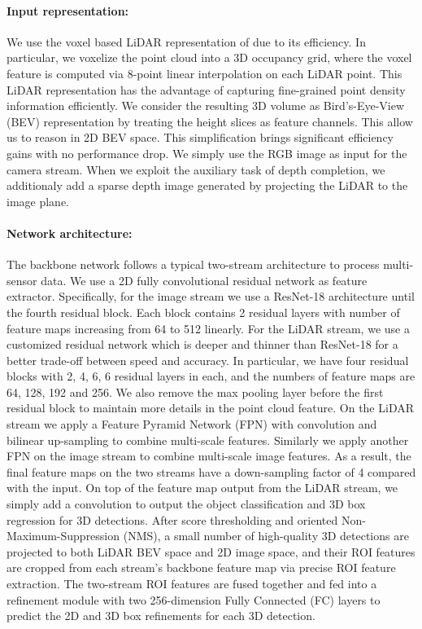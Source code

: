 \documentclass[10pt,twocolumn,letterpaper]{article}
\begin{document}
\paragraph{Input representation:}
We use the voxel based LiDAR representation of \cite{contfuse} due to its efficiency. In particular, we voxelize the point cloud into a 3D occupancy grid, where the voxel feature is computed via 8-point linear interpolation on each LiDAR point. This LiDAR representation has the advantage of capturing fine-grained point density information efficiently. We consider the resulting 3D volume as Bird's-Eye-View (BEV) representation by treating the height slices as feature channels. This allow us to reason   in  2D BEV space. This simplification brings significant efficiency gains with no performance drop.
We simply use the RGB  image as input for the camera stream. When we exploit the auxiliary task of depth completion, we additionaly add a sparse depth image generated by projecting the LiDAR to the image plane.

\paragraph{Network architecture:}
The backbone network follows a typical two-stream architecture to process multi-sensor data. We use a 2D fully  convolutional residual network \cite{resnet} as feature extractor. Specifically, for the image stream we use a ResNet-18 \cite{resnet} architecture until the fourth residual block. Each block contains 2 residual layers with number of feature maps increasing from 64 to 512 linearly. For the LiDAR stream, we use a customized residual network which is deeper and thinner than ResNet-18 for a better trade-off between speed and accuracy. In particular, we have four residual blocks with 2, 4, 6, 6 residual layers in each, and the numbers of feature maps are 64, 128, 192 and 256. We also remove the max pooling layer before the first residual block to maintain more details in the point cloud feature. On the LiDAR stream we apply a Feature Pyramid Network (FPN) \cite{fpn} with  convolution and bilinear up-sampling to combine multi-scale features. Similarly we apply another FPN on the image stream  to combine multi-scale image features. 
As a result, the final feature maps on the two streams have a down-sampling factor of 4 compared with the input. On top of the feature map output from the LiDAR stream, we simply add a  convolution to output the object classification and 3D box regression for 3D detections. After score thresholding and oriented Non-Maximum-Suppression (NMS), a small number of high-quality 3D detections are projected to both LiDAR BEV space and 2D image space, and their ROI features are cropped from each stream's backbone feature map via precise ROI feature extraction. The two-stream ROI features are fused together and fed into a refinement module with two 256-dimension Fully Connected (FC) layers to predict the 2D and 3D box refinements for each 3D detection.
\end{document}
